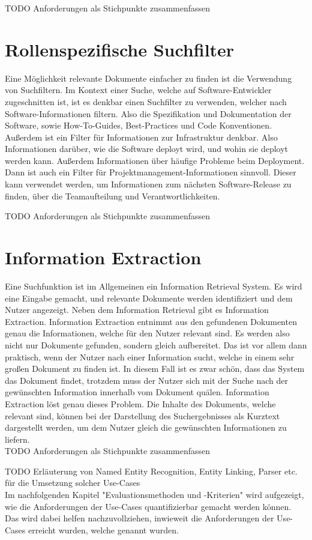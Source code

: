 TODO Anforderungen als Stichpunkte zusammenfassen

\section{Rollenspezifische Suchfilter}
\label{chap:rollenspezifische-suchfilter}
Eine Möglichkeit relevante Dokumente einfacher zu finden ist die Verwendung von Suchfiltern.
Im Kontext einer Suche, welche auf Software-Entwickler zugeschnitten ist, ist es denkbar einen Suchfilter zu verwenden, welcher nach Software-Informationen filtern.
Also die Spezifikation und Dokumentation der Software, sowie How-To-Guides, Best-Practices und Code Konventionen.
Außerdem ist ein Filter für Informationen zur Infrastruktur denkbar. Also Informationen darüber, wie die Software deployt wird, und wohin sie deployt werden kann.
Außerdem Informationen über häufige Probleme beim Deployment.
Dann ist auch ein Filter für Projektmanagement-Informationen sinnvoll.
Dieser kann verwendet werden, um Informationen zum nächsten Software-Release zu finden, über die Teamaufteilung und Verantwortlichkeiten.

TODO Anforderungen als Stichpunkte zusammenfassen

\section{Information Extraction}
Eine Suchfunktion ist im Allgemeinen ein Information Retrieval System.
Es wird eine Eingabe gemacht, und relevante Dokumente werden identifiziert und dem Nutzer angezeigt.
Neben dem Information Retrieval gibt es Information Extraction.
Information Extraction entnimmt aus den gefundenen Dokumenten genau die Informationen, welche für den Nutzer relevant sind.
Es werden also nicht nur Dokumente gefunden, sondern gleich aufbereitet.
Das ist vor allem dann praktisch, wenn der Nutzer nach einer Information sucht, welche in einem sehr großen Dokument zu finden ist.
In diesem Fall ist es zwar schön, dass das System das Dokument findet, trotzdem muss der Nutzer sich mit der Suche nach der gewünschten Information innerhalb vom Dokument quälen.
Information Extraction löst genau dieses Problem.
Die Inhalte des Dokuments, welche relevant sind, können bei der Darstellung des Suchergebnisses als Kurztext dargestellt werden, um dem Nutzer gleich die gewünschten Informationen zu liefern.\\

TODO Anforderungen als Stichpunkte zusammenfassen

TODO Erläuterung von Named Entity Recognition, Entity Linking, Parser etc. für die Umsetzung solcher Use-Cases\\

Im nachfolgenden Kapitel "Evaluationsmethoden und -Kriterien" wird aufgezeigt, wie die Anforderungen der Use-Cases quantifizierbar gemacht werden können.
Das wird dabei helfen nachzuvollziehen, inwieweit die Anforderungen der Use-Cases erreicht wurden, welche genannt wurden.

